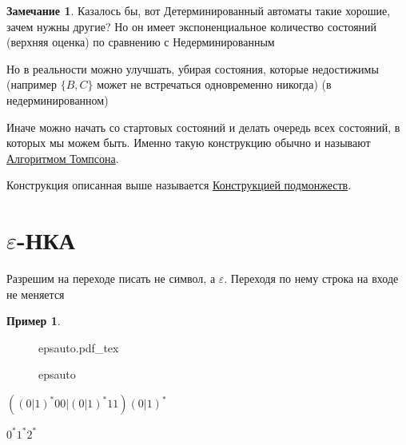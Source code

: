 \documentclass{book}
\theoremstyle{definition}
\newtheorem*{note}{Замечание}
\newtheorem*{example}{Пример}
\newcommand{\incfig}[1]{%
    \def\svgwidth{\columnwidth}
    {#1.pdf_tex}
}
\begin{document}
\begin{note}
    Казалось бы, вот Детерминированный автоматы такие хорошие, зачем нужны другие? Но он имеет экспоненциальное количество состояний (верхняя оценка) по сравнению с Недерминированным

    Но в реальности можно улучшать, убирая состояния, которые недостижимы (например $\{B,C\}$ может не встречаться одновременно никогда) (в недерминированном)

    Иначе можно начать со стартовых состояний и делать очередь всех состояний, в которых мы можем быть. Именно такую конструкцию обычно и называют \underline{Алгоритмом Томпсона}.

    Конструкция описанная выше называется \underline{Конструкцией подмонжеств}.
\end{note}

\section{$\varepsilon$-НКА}

Разрешим на переходе писать не символ, а $\varepsilon$. Переходя по нему строка на входе не меняется

\begin{example}
\begin{figure}[!ht]
    \centering
    \incfig{epsauto}
    \caption{epsauto}
    \label{fig:epsauto}
\end{figure}

$\left( \left( 0|1 \right) ^*00|\left( 0|1 \right) ^*11 \right) \left( 0|1 \right) ^*$

 $0^*1^*2^*$
\end{example}
\end{document}
